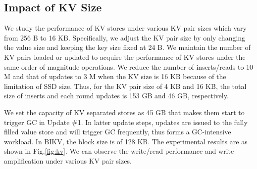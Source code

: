 \documentclass[sigconf]{acmart}
\begin{document}
\subsection{Impact of KV Size}
We study the performance of KV stores under various KV pair sizes which vary from 256 B to 16 KB. Specifically, we adjust the KV pair size by only changing the value size and keeping the key size fixed at 24 B. We maintain the number of KV pairs loaded or updated to acquire the performance of KV stores under the same order of magnitude operations. We reduce the number of inserts/reads to 10 M and that of updates to 3 M when the KV size is 16 KB because of the limitation of SSD size. Thus, for the KV pair size of 4 KB and 16 KB, the total size of inserts and each round updates is 153 GB and 46 GB, respectively.

We set the capacity of KV separated stores as 45 GB that makes them start to trigger GC in Update \#1. In latter update steps, updates are issued to the fully filled value store and will trigger GC frequently, thus forms a GC-intensive workload. In BIKV, the block size is of 128 KB. The experimental results are as shown in Fig.\ref{fig:kv}. We can observe the write/read performance and write amplification under various KV pair sizes. 

\end{document}
